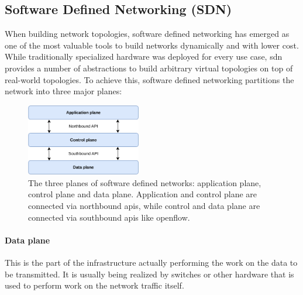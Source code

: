 \subsection{Software Defined Networking (SDN)}
When building network topologies, software defined networking \cite{sdn} has emerged as one of the most valuable tools to build networks dynamically and with lower cost.
While traditionally specialized hardware was deployed for every use case, \acrshort{sdn} provides a number of abstractions to build arbitrary virtual topologies on top of real-world topologies.
To achieve this, software defined networking partitions the network into three major planes:

\begin{figure}[h]
    \centering
    \includegraphics[width=5cm]{images/chapter_2/sdn.png}
    \caption[Software defined networking (\acrshort{sdn})]{The three planes of software defined networks: application plane, control plane and data plane. Application and control plane are connected via northbound \acrshort{api}s, while control and data plane are connected via southbound \acrshort{api}s like \Gls{openflow}.}
    \label{fig:sdn}
\end{figure}

\paragraph{Data plane} This is the part of the infrastructure actually performing the work on the data to be transmitted. It is usually being realized by switches or other hardware that is used to perform work on the network traffic itself.

